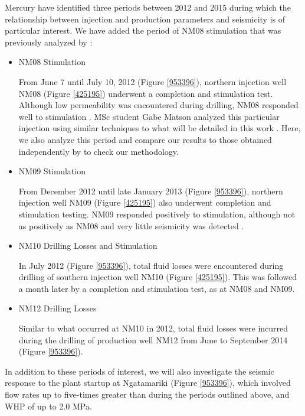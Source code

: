 Mercury have identified three periods between 2012 and 2015 during which the relationship between injection and production parameters and seismicity is of particular interest. We have added the period of NM08 stimulation that was previously analyzed by \citet{matson2019thesis}:
\begin{itemize}
  \item{NM08 Stimulation}
  
  From June 7 until July 10, 2012 (Figure \ref{953396}), northern injection well NM08 (Figure \ref{425195}) underwent a completion and stimulation test. Although low \gls{permeability} was encountered during drilling, NM08 responded well to stimulation \citep{Clearwater_2015}. MSc student Gabe Matson analyzed this particular injection using similar techniques to what will be detailed in this work \citep{matson2019thesis}. Here, we also analyze this period and compare our results to those obtained independently by \citet{matson2019thesis} to check our methodology.
  \item{NM09 Stimulation}
  
  From December 2012 until late January 2013 (Figure \ref{953396}), northern injection well NM09 (Figure \ref{425195}) also underwent completion and stimulation testing. NM09 responded positively to stimulation, although not as positively as NM08 and very little seismicity was detected \citep{Clearwater_2015}.
  \item{NM10 Drilling Losses and Stimulation}
  
  In July 2012 (Figure \ref{953396}), total fluid losses were encountered during drilling of southern injection well NM10 (Figure \ref{425195}). This was followed a month later by a completion and stimulation test, as at NM08 and NM09.
  \item{NM12 Drilling Losses}
  
  Similar to what occurred at NM10 in 2012, total fluid losses were incurred during the drilling of production well NM12 from June to September 2014 (Figure \ref{953396}).
\end{itemize}

In addition to these periods of interest, we will also investigate the seismic response to the plant startup at Ngatamariki (Figure \ref{953396}), which involved flow rates up to five-times greater than during the periods outlined above, and \acrshort{WHP} of up to 2.0 MPa.

